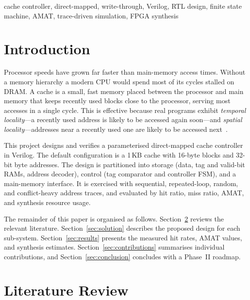 \documentclass[conference]{IEEEtran}
\renewcommand{\_}{\textunderscore\allowbreak{}}
\begin{document}
\begin{IEEEkeywords}
cache controller, direct-mapped, write-through, Verilog, RTL design,
finite state machine, AMAT, trace-driven simulation, FPGA synthesis
\end{IEEEkeywords}

\section{Introduction}
\label{sec:intro}

Processor speeds have grown far faster than main-memory access times.
Without a memory hierarchy a modern CPU would spend most of its cycles
stalled on DRAM. A cache is a small, fast memory placed between the
processor and main memory that keeps recently used blocks close to the
processor, serving most accesses in a single cycle. This is effective
because real programs exhibit \emph{temporal locality}---a recently used
address is likely to be accessed again soon---and \emph{spatial
locality}---addresses near a recently used one are likely to be accessed
next~\cite{smith1982,hennessy2017}.

This project designs and verifies a parameterised direct-mapped cache
controller in Verilog. The default configuration is a 1\,KB cache with
16-byte blocks and 32-bit byte addresses. The design is partitioned into
storage (data, tag and valid-bit RAMs, address decoder), control (tag
comparator and controller FSM), and a main-memory interface. It is
exercised with sequential, repeated-loop, random, and conflict-heavy
address traces, and evaluated by hit ratio, miss ratio, AMAT, and
synthesis resource usage.

The remainder of this paper is organised as follows.
Section~\ref{sec:litrev} reviews the relevant literature.
Section~\ref{sec:solution} describes the proposed design for each
sub-system. Section~\ref{sec:results} presents the measured hit rates,
AMAT values, and synthesis estimates. Section~\ref{sec:contributions}
summarises individual contributions, and Section~\ref{sec:conclusion}
concludes with a Phase~II roadmap.

\section{Literature Review}
\label{sec:litrev}
\end{document}
